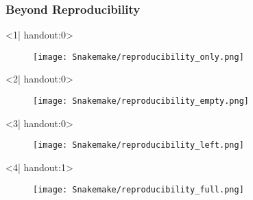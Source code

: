 \begin{frame}
	\frametitle{Beyond Reproducibility}
	\begin{onlyenv}<1| handout:0>
		\begin{figure}
			\centering
			\texttt{[image: Snakemake/reproducibility\_only.png]}
		\end{figure}
	\end{onlyenv}
	\begin{onlyenv}<2| handout:0>
		\begin{figure}
			\centering
			\texttt{[image: Snakemake/reproducibility\_empty.png]}
		\end{figure}
	\end{onlyenv}
	\begin{onlyenv}<3| handout:0>
		\begin{figure}
			\centering
			\texttt{[image: Snakemake/reproducibility\_left.png]}
		\end{figure}
	\end{onlyenv}
	\begin{onlyenv}<4| handout:1>
		\begin{figure}
			\centering
			\texttt{[image: Snakemake/reproducibility\_full.png]}
		\end{figure}
	\end{onlyenv}
	\footnotesize{}
\end{frame}